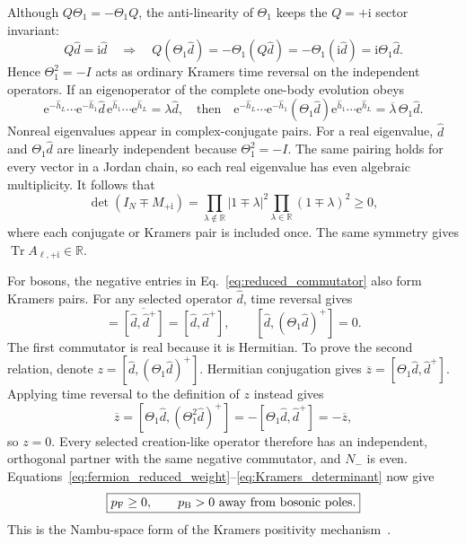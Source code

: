 \documentclass[onecolumn,aps,prb,amsmath,amssymb,superscriptaddress,longbibliography]{revtex4-2}
\newcommand{\Tr}{\operatorname{Tr}}
\newcommand{\ee}{\mathrm{e}}
\newcommand{\ii}{\mathrm{i}}
\begin{document}
Although \(Q\Theta_1=-\Theta_1Q\), the anti-linearity of \(\Theta_1\) keeps the \(Q=+\ii\) sector invariant:
\begin{equation}
    Q\hat d=\ii\hat d
    \quad\Longrightarrow\quad
    Q(\Theta_1\hat d)=-\Theta_1(Q\hat d)
    =-\Theta_1(\ii\hat d)=\ii\Theta_1\hat d.
    \label{eq:Kramers_in_reduced_space}
\end{equation}
Hence \(\Theta_1^2=-I\) acts as ordinary Kramers time reversal on the independent operators.  If an eigenoperator of the complete one-body evolution obeys
\begin{equation}
    \ee^{-\hat h_L}\cdots\ee^{-\hat h_1}
    \hat d\,
    \ee^{\hat h_1}\cdots\ee^{\hat h_L}
    =\lambda\hat d,
    \quad\text{then}\quad
    \ee^{-\hat h_L}\cdots\ee^{-\hat h_1}
    (\Theta_1\hat d)
    \ee^{\hat h_1}\cdots\ee^{\hat h_L}
    =\overline\lambda\,\Theta_1\hat d.
    \label{eq:Kramers_eigenvalues}
\end{equation}
Nonreal eigenvalues appear in complex-conjugate pairs.  For a real eigenvalue, \(\hat d\) and \(\Theta_1\hat d\) are linearly independent because \(\Theta_1^2=-I\).  The same pairing holds for every vector in a Jordan chain, so each real eigenvalue has even algebraic multiplicity.  It follows that
\begin{equation}
    \det(I_N\mp M_{+\ii})
    =\prod_{\lambda\notin\mathbb R}|1\mp\lambda|^2
     \prod_{\lambda\in\mathbb R}(1\mp\lambda)^2
    \geq0,
    \label{eq:Kramers_determinant}
\end{equation}
where each conjugate or Kramers pair is included once.  The same symmetry gives \(\Tr A_{\ell,+\ii}\in\mathbb R\).

For bosons, the negative entries in Eq.~\eqref{eq:reduced_commutator} also form Kramers pairs.  For any selected operator \(\hat d\), time reversal gives
\begin{equation}
    [\Theta_1\hat d,(\Theta_1\hat d)^+]
    =\overline{[\hat d,\hat d^+]}
    =[\hat d,\hat d^+],
    \qquad
    [\hat d,(\Theta_1\hat d)^+]=0.
    \label{eq:commutator_Kramers_pair}
\end{equation}
The first commutator is real because it is Hermitian.  To prove the second relation, denote \(z=[\hat d,(\Theta_1\hat d)^+]\).  Hermitian conjugation gives \(\overline z=[\Theta_1\hat d,\hat d^+]\).  Applying time reversal to the definition of \(z\) instead gives
\begin{equation}
    \overline z
    =[\Theta_1\hat d,(\Theta_1^2\hat d)^+]
    =-[\Theta_1\hat d,\hat d^+]
    =-\overline z,
\end{equation}
so \(z=0\).  Every selected creation-like operator therefore has an independent, orthogonal partner with the same negative commutator, and \(N_-\) is even.  Equations~\eqref{eq:fermion_reduced_weight}--\eqref{eq:Kramers_determinant} now give
\begin{equation}
    \boxed{p_{\rm F}\geq0,\qquad p_{\rm B}>0\ \text{away from bosonic poles}.}
    \label{eq:kramers_class_positive}
\end{equation}
This is the Nambu-space form of the Kramers positivity mechanism~\cite{li2016prl}.
\end{document}
